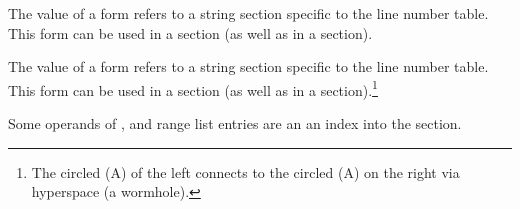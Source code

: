 \begin{description}
The value of a \DWFORMlinestrp{} form refers to a
string section specific to the line number table.
This form can be used in a \dotdebugline{} section
(as well as in a \dotdebuginfo{} section).

The value of a \DWFORMlinestrp{} form refers to a
string section specific to the line number table.
This form can be used in a \dotdebuginfo{} section
(as well as in a \dotdebugline{} section).\footnote{
\bb
The circled (A) of the left connects to the circled
(A) on the right 
\eb
via hyperspace (a wormhole).}
\bb

Some operands of \DWRLEbaseaddressx, \DWRLEstartxendx{} and 
\DWRLEstartxlength{} range list entries are an 
an index into the \dotdebugaddr{} section.
\eb

\end{description}



